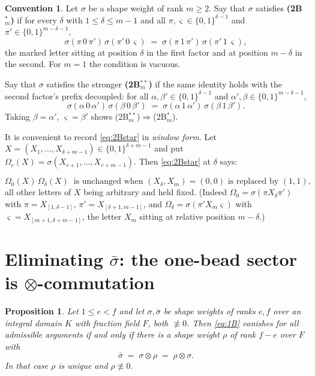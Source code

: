 \documentclass[11pt]{article}
\newtheorem{proposition}[theorem]{Proposition}
\theoremstyle{definition}
\newtheorem{convention}[theorem]{Convention}
\theoremstyle{remark}
\begin{document}
\begin{convention}\label{conv:2Bstar}
Let $\sigma$ be a shape weight of rank $m\ge2$.  Say that $\sigma$ satisfies
\textbf{(2B$^*_m$)} if for every $\delta$ with $1\le\delta\le m-1$ and all
$\pi,\varsigma\in\{0,1\}^{\delta-1}$ and $\pi'\in\{0,1\}^{m-\delta-1}$,
\begin{equation}\label{eq:2Bstar}
  \sigma(\pi\,0\,\pi')\,\sigma(\pi'\,0\,\varsigma)
  \;=\;\sigma(\pi\,1\,\pi')\,\sigma(\pi'\,1\,\varsigma),
\end{equation}
the marked letter sitting at position $\delta$ in the first factor and at position
$m-\delta$ in the second.  For $m=1$ the condition is vacuous.

Say that $\sigma$ satisfies the stronger \textbf{(2B$^{**}_m$)} if the same identity holds
with the second factor's prefix decoupled: for all $\alpha,\beta'\in\{0,1\}^{\delta-1}$ and
$\alpha',\beta\in\{0,1\}^{m-\delta-1}$,
\begin{equation}\label{eq:2Bstarstar}
  \sigma(\alpha\,0\,\alpha')\,\sigma(\beta\,0\,\beta')
  \;=\;\sigma(\alpha\,1\,\alpha')\,\sigma(\beta\,1\,\beta').
\end{equation}
Taking $\beta=\alpha'$, $\varsigma=\beta'$ shows (2B$^{**}_m$)$\Rightarrow$(2B$^*_m$).
\end{convention}

It is convenient to record \eqref{eq:2Bstar} in \emph{window form}.  Let
$X=(X_1,\dots,X_{\delta+m-1})\in\{0,1\}^{\delta+m-1}$ and put
$\Omega_c(X)=\sigma(X_{c+1},\dots,X_{c+m-1})$.  Then \eqref{eq:2Bstar} at $\delta$ says:

\begin{equation}\label{eq:2Bwindow}
  \Omega_0(X)\,\Omega_\delta(X) \ \text{ is unchanged when } (X_\delta,X_m)=(0,0)
  \text{ is replaced by } (1,1),
\end{equation}
all other letters of $X$ being arbitrary and held fixed.  (Indeed $\Omega_0=\sigma(\pi
X_\delta\pi')$ with $\pi=X_{[1,\delta-1]}$, $\pi'=X_{[\delta+1,m-1]}$, and
$\Omega_\delta=\sigma(\pi' X_m\varsigma)$ with $\varsigma=X_{[m+1,\delta+m-1]}$, the letter
$X_m$ sitting at relative position $m-\delta$.)

\section{Eliminating $\bar\sigma$: the one-bead sector is $\otimes$-commutation}
\label{sec:reduce}

\begin{proposition}\label{prop:1B}
Let $1\le e<f$ and let $\sigma,\bar\sigma$ be shape weights of ranks $e,f$ over an integral
domain $K$ with fraction field $F$, both $\not\equiv0$.  Then \eqref{eq:1B} vanishes for all
admissible arguments if and only if there is a shape weight $\rho$ of rank $f-e$ over $F$
with
\begin{equation}\label{eq:comm}
   \bar\sigma \;=\; \sigma\otimes\rho \;=\;\rho\otimes\sigma .
\end{equation}
In that case $\rho$ is unique and $\rho\not\equiv0$.
\end{proposition}
\end{document}
